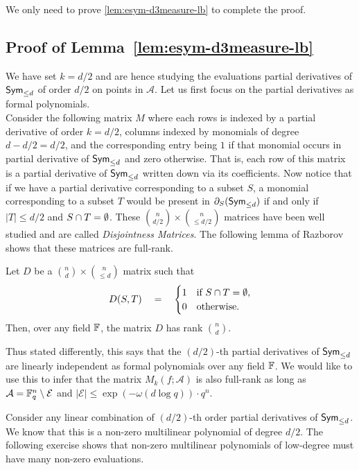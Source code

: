 \noindent
We only need to prove \autoref{lem:esym-d3measure-lb} to complete the proof. 

\subsection{Proof of Lemma~\ref{lem:esym-d3measure-lb}}

We have set $k = d/2$ and are hence studying the evaluations partial derivatives of $\operatorname{\mathsf{Sym}}_{\leq d}$ of order $d/2$ on points in $\mathcal{A}$. Let us first focus on the partial derivatives as formal polynomials. \\

Consider the following matrix $M$ where each rows is indexed by a partial derivative of order $k = d/2$, columns indexed by monomials of degree $d -d/2 = d/2$, and the corresponding entry being $1$ if that monomial occurs in partial derivative of $\operatorname{\mathsf{Sym}}_{\leq d}$ and zero otherwise. That is, each row of this matrix is a partial derivative of $\operatorname{\mathsf{Sym}}_{\leq d}$ written down via its coefficients. Now notice that if we have a partial derivative corresponding to a subset $S$, a monomial corresponding to a subset $T$ would be present in $\partial_S(\operatorname{\mathsf{Sym}}_{\leq d})$ if and only if $|T| \leq d/2$ and $S \cap T = \emptyset$. These $\binom{n}{d/2} \times \binom{n}{\leq d/2}$ matrices have been well studied and are called  \emph{Disjointness Matrices}. The following lemma of Razborov~\cite{razborov87} shows that these matrices are full-rank. 
\begin{lemmawp} Let $D$ be a $\binom{n}{d} \times \binom{n}{\leq d}$ matrix such that 
\[
D(S,T) \quad = \quad \begin{cases}
  1 & \text{if $S \cap T = \emptyset$},\\
  0 & \text{otherwise}.
\end{cases}
\]
Then, over any field $\mathbb{F}$, the matrix $D$ has rank $\binom{n}{d}$. 
\end{lemmawp}

Thus stated differently, this says that the $(d/2)$-th partial derivatives of $\operatorname{\mathsf{Sym}}_{\leq d}$ are linearly independent as formal polynomials over any field $\mathbb{F}$. We would like to use this to infer that the matrix $M_k(f;\mathcal{A})$ is also full-rank as long as $\mathcal{A} = \mathbb{F}_q^n \setminus \mathcal{E}$ and $|\mathcal{E}| \leq \exp(-\omega(d \log q)) \cdot q^n$. 

Consider any linear combination of $(d/2)$-th order partial derivatives of $\operatorname{\mathsf{Sym}}_{\leq d}$. We know that this is a non-zero multilinear polynomial of degree $d/2$. The following exercise shows that non-zero multilinear polynomials of low-degree must have many non-zero evaluations. 

